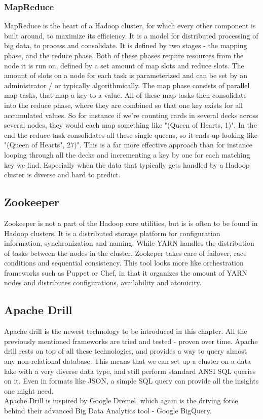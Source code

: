 \documentclass[a4paper,english]{report}
\begin{document}
				\subsubsection{MapReduce}
					MapReduce is the heart of a Hadoop cluster, for which every other component is built around, to maximize its efficiency. It is a model for distributed processing of big data, to process and consolidate. It is defined by two stages - the mapping phase, and the reduce phase. Both of these phases require resources from the node it is run on, defined by a set amount of map slots and reduce slots. The amount of slots on a node for each task is parameterized and can be set by an administrator / or typically algorithmically. The map phase consists of parallel map tasks, that map a key to a value. All of these map tasks then consolidate into the reduce phase, where they are combined so that one key exists for all accumulated values. So for instance if we're counting cards in several decks across several nodes, they would each map something like "(Queen of Hearts, 1)". In the end the reduce task consolidates all these single queens, so it ends up looking like "(Queen of Hearts", 27)". This is a far more effective approach than for instance looping through all the decks and incrementing a key by one for each matching key we find. Especially when the data that typically gets handled by a Hadoop cluster is diverse and hard to predict.
						
			\subsection{Zookeeper}
				Zookeeper is not a part of the Hadoop core utilities, but is is often to be found in Hadoop clusters. It is a distributed storage platform for configuration information, synchronization and naming. While YARN handles the distribution of tasks between the nodes in the cluster, Zookeper takes care of failover, race conditions and sequential consistency. This tool looks more like orchestration frameworks such as Puppet or Chef, in that it organizes the amount of YARN nodes and distributes configurations, availability and atomicity.
			\subsection{Apache Drill}
				Apache drill is the newest technology to be introduced in this chapter. All the previously mentioned frameworks are tried and tested - proven over time. Apache drill rests on top of all these technologies, and provides a way to query almost any non-relational database. This means that we can set up a cluster on a data lake with a very diverse data type, and still perform standard ANSI SQL queries on it. Even in formats like JSON, a simple SQL query can provide all the insights one might need.\\
				Apache Drill is inspired by Google Dremel, which again is the driving force behind their advanced Big Data Analytics tool - Google BigQuery.
\end{document}
